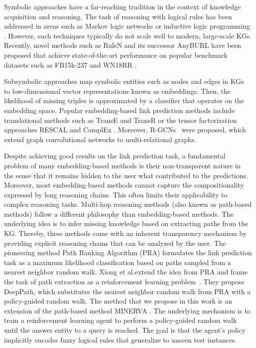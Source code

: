 \documentclass{article}
\begin{document}
Symbolic approaches have a far-reaching tradition in the context of knowledge acquisition and reasoning. The task of reasoning with logical rules has been addressed in areas such as Markov logic networks \cite{richardson2006markov} or inductive logic programming \cite{muggleton1991inductive}. However, such techniques typically do not scale well to modern, large-scale KGs. Recently, novel methods such as RuleN \cite{meilicke2018fine} and its successor AnyBURL \cite{meilicke2019anytime} have been proposed that achieve state-of-the-art performance on popular benchmark datasets such as FB15k-237 \cite{toutanova2015representing} and WN18RR \cite{dettmers2018convolutional}. %

Subsymbolic approaches map symbolic entities such as nodes and edges in KGs to low-dimensional vector representations known as embeddings. Then, the likelihood of missing triples is approximated by a classifier that operates on the embedding space. Popular embedding-based link prediction methods include translational methods such as TransE \cite{bordes2013translating} and TransR \cite{lin2015learning} or the tensor factorization approaches RESCAL \cite{nickel2011three} and ComplEx \cite{trouillon2016complex}. Moreover, R-GCNs~\cite{schlichtkrull2018modeling} were proposed, which extend graph convolutional networks \cite{kipf2016semi} to multi-relational graphs.

Despite achieving good results on the link prediction task, a fundamental problem of many embedding-based methods is their non-transparent nature in the sense that it remains hidden to the user what contributed to the  predictions. Moreover, most embedding-based methods cannot capture the compositionality expressed by long reasoning chains. This often limits their applicability to complex reasoning tasks. Multi-hop reasoning methods (also known as path-based methods) follow a different philosophy than embedding-based methods. The underlying idea is to infer missing knowledge based on extracting paths from the KG. Thereby, these methods come with an inherent transparency mechanism by providing explicit reasoning chains that can be analyzed by the user. The pioneering method Path Ranking Algorithm (PRA) \cite{lao2010relational} formulates the link prediction task as a maximum likelihood classification based on paths sampled from a nearest neighbor random walk. Xiong et al.\;extend the idea from PRA and frame the task of path extraction as a reinforcement learning problem~\cite{wenhan_emnlp2017}. They propose DeepPath, which substitutes the nearest neighbor random walk from PRA with a policy-guided random walk. The method that we propose in this work is an extension of the path-based method MINERVA \cite{minerva}. The underlying mechanism is to train a reinforcement learning agent to perform a policy-guided random walk until the answer entity to a query is reached. The goal is that the agent's policy implicitly encodes fuzzy logical rules that generalize to unseen test instances.
\end{document}
